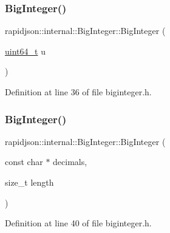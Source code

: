 \subsubsection{\texorpdfstring{BigInteger()}{BigInteger()}\hspace{0.1cm}{\footnotesize\ttfamily [2/3]}}
{\footnotesize\ttfamily rapidjson\+::internal\+::\+Big\+Integer\+::\+Big\+Integer (\begin{DoxyParamCaption}\item[{\mbox{\hyperlink{stdint_8h_aec6fcb673ff035718c238c8c9d544c47}{uint64\+\_\+t}}}]{u }\end{DoxyParamCaption})\hspace{0.3cm}{\ttfamily [explicit]}}



Definition at line 36 of file biginteger.\+h.


\begin{DoxyCode}{0}

\end{DoxyCode}
\mbox{\label{classrapidjson_1_1internal_1_1_big_integer_a8a62a7693c0ac5f0394557ad36449e1f}} 
\subsubsection{\texorpdfstring{BigInteger()}{BigInteger()}\hspace{0.1cm}{\footnotesize\ttfamily [3/3]}}
{\footnotesize\ttfamily rapidjson\+::internal\+::\+Big\+Integer\+::\+Big\+Integer (\begin{DoxyParamCaption}\item[{const char $\ast$}]{decimals,  }\item[{size\+\_\+t}]{length }\end{DoxyParamCaption})}



Definition at line 40 of file biginteger.\+h.


